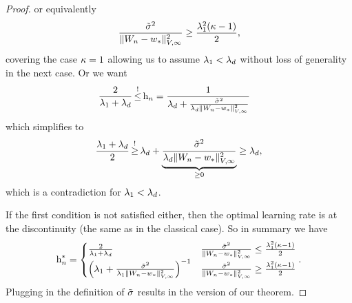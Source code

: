 \begin{proof}
	or equivalently
	\begin{align*}
		\frac{\tilde{\sigma}^2}{
			\|W_n-w_*\|_{V,\infty}^2
		}
		\ge\frac{\lambda_1^2(\kappa-1)}{2},
	\end{align*}
	covering the case \(\kappa=1\) allowing us to assume \(\lambda_1 <
	\lambda_d\) without loss of generality in the next case.
 	Or we want
	\begin{align*}
		\frac{2}{\hesseEV_1+\hesseEV_\dimension} \xle{!} \lr_n
		&= \frac{1}{
			\hesseEV_\dimension
			+ \frac{\tilde{\stdBound}^2}{
				\hesseEV_\dimension\|\Weights_n-\minimum\|_{V,\infty}^2
			}
		}
	\end{align*}
	which simplifies to
	\begin{align*}
		\frac{\hesseEV_1+\hesseEV_\dimension}{2}
		\xge{!} \hesseEV_\dimension
		+ \underbrace{\frac{\tilde{\stdBound}^2}{
			\hesseEV_\dimension\|\Weights_n-\minimum\|_{V,\infty}^2
		}}_{\ge 0}
		\ge \hesseEV_\dimension,
	\end{align*}
	which is a contradiction for \(\lambda_1 < \lambda_d\).

	If the first condition is not satisfied either, then the optimal learning
	rate is at the discontinuity (the same as in the classical case). So in
	summary we have
	\begin{align*}
		\text{h}_n^* = \begin{cases}
			\frac{2}{\lambda_1+\lambda_d}
			&\frac{\tilde{\sigma}^2}{
				\|W_n-w_*\|_{V,\infty}^2
			}
			\le \frac{\lambda_1^2(\kappa-1)}{2}\\
			\left(
				\lambda_1 + \frac{\tilde{\sigma}^2}{
					\lambda_1\|W_n-w_*\|_{V,\infty}^2
				}
			\right)^{-1}
			&\frac{\tilde{\sigma}^2}{
				\|W_n-w_*\|_{V,\infty}^2
			}
			\ge \frac{\lambda_1^2(\kappa-1)}{2}
		\end{cases}.
	\end{align*}
	Plugging in the definition of \(\tilde{\sigma}\) results in the version
	of our theorem.


\end{proof}

